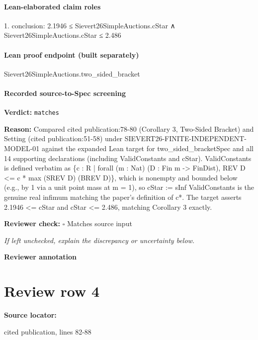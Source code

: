 \documentclass[10pt]{article}
\newcommand{\reviewerbox}{%
  \par\noindent\fbox{\parbox{0.96\linewidth}{\rule{0pt}{0.38in}}}\par
}
\newcommand{\reviewmatch}[1]{%
  \par\noindent\textbf{Reviewer check:} $\square$\; #1\par
  \noindent\emph{If left unchecked, explain the discrepancy or uncertainty below.}\par
}
\begin{document}
\paragraph{Lean-elaborated claim roles}\begin{ReviewVerbatim}
1. conclusion: 2.1946 ≤ Sievert26SimpleAuctions.cStar ∧ Sievert26SimpleAuctions.cStar ≤ 2.486
\end{ReviewVerbatim}

\paragraph{Lean proof endpoint (built separately)}\begin{ReviewVerbatim}
Sievert26SimpleAuctions.two_sided_bracket
\end{ReviewVerbatim}

\paragraph{Recorded source-to-Spec screening}
\textbf{Verdict:} \texttt{matches}
\\
{\raggedright
\textbf{Reason:} Compared cited publication:\allowbreak{}78-\allowbreak{}80 (Corollary 3, Two-\allowbreak{}Sided Bracket) and Setting (cited publication:\allowbreak{}51-\allowbreak{}58) under SIEVERT26-\allowbreak{}FINITE-\allowbreak{}INDEPENDENT-\allowbreak{}MODEL-\allowbreak{}01 against the expanded Lean target for two\_\allowbreak{}sided\_\allowbreak{}bracketSpec and all 14 supporting declarations (including ValidConstants and cStar).\allowbreak{} ValidConstants is defined verbatim as \{c :\allowbreak{} R | forall (m :\allowbreak{} Nat) (D :\allowbreak{} Fin m -\allowbreak{}> FinDist), REV D <= c * max (SREV D) (BREV D)\}, which is nonempty and bounded below (e.\allowbreak{}g.\allowbreak{}, by 1 via a unit point mass at m = 1), so cStar :\allowbreak{}= sInf ValidConstants is the genuine real infimum matching the paper's definition of c*.\allowbreak{} The target asserts 2.\allowbreak{}1946 <= cStar and cStar <= 2.\allowbreak{}486, matching Corollary 3 exactly.\allowbreak{}
\par}
\reviewmatch{Matches source input}
\noindent\textbf{Reviewer annotation}\par
\reviewerbox
\clearpage
\hypertarget{source-claim-401774aa30d66b30}{}
\section*{Review row 4}
\textbf{Source locator:} {\footnotesize\raggedright cited publication, lines 82-\allowbreak{}88\par}
\end{document}
